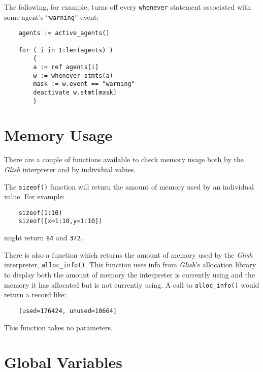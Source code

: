 \begin{sloppy}
\begin{list}{}{}
The following, for example, turns off every {\tt whenever} statement
associated with some agent's ``{\tt warning}'' event:
\begin{verbatim}
    agents := active_agents()

    for ( i in 1:len(agents) )
        {
        a := ref agents[i]
        w := whenever_stmts(a)
        mask := w.event == "warning"
        deactivate w.stmt[mask]
        }
\end{verbatim}

\end{list}
\end{sloppy}

\section{Memory Usage}
\label{alloc-funcs}
There are a couple of functions available to check memory usage both by the
{\em Glish} interpreter and by individual values.

\label{sizeof-func}
The {\tt sizeof()} function will return the amount of memory used by an
individual value. For example:
\begin{verbatim}
    sizeof(1:10)
    sizeof([x=1:10,y=1:10])
\end{verbatim}
might return {\tt 84} and {\tt 372}.

\label{alloc_info-func}
There is also a function which returns the amount of memory used by the
{\em Glish} interpreter, {\tt alloc\_info()}. This function uses info from
{\em Glish}'s allocation library to display both the amount of memory the
interpreter is currently using and the memory it has allocated but is not
currently using. A call to \verb+alloc_info()+ would return a record like:
\begin{verbatim}
    [used=176424, unused=10664]
\end{verbatim}
This function takes no parameters.


\section{Global Variables}

